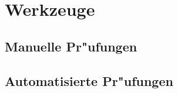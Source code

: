 %



\section{Werkzeuge}
\label{Abschnitt:Programmfehler:Werkzeuge}







\subsection{Manuelle Pr{"u}fungen}
\label{Abschnitt:Programmfehler:Werkzeuge:Manuell}






\subsection{Automatisierte Pr{"u}fungen}
\label{Abschnitt:Programmfehler:Werkzeuge:Automatisiert}







